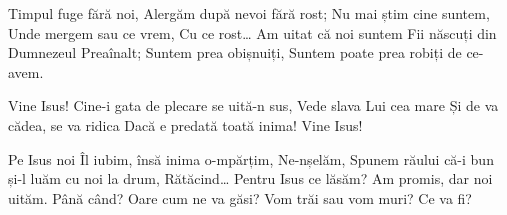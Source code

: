 \beginverse
Timpul fuge fără noi,
Alergăm după nevoi fără rost;
Nu mai știm cine suntem,
Unde mergem sau ce vrem,
Cu ce rost…
Am uitat că noi suntem
Fii născuți din Dumnezeul Preaînalt;
Suntem prea obișnuiți,
Suntem poate prea robiți de ce-avem.
\endverse

\beginchorus
Vine Isus!
Cine-i gata de plecare se uită-n sus,
Vede slava Lui cea mare
Și de va cădea, se va ridica
Dacă e predată toată inima!
Vine Isus!
\endchorus

\beginverse
Pe Isus noi Îl iubim, însă inima o-mpărțim,
Ne-nșelăm,
Spunem răului că-i bun și-l luăm cu noi la drum,
Rătăcind…
Pentru Isus ce lăsăm?
Am promis, dar noi uităm. Până când?
Oare cum ne va găsi?
Vom trăi sau vom muri? Ce va fi?
\endverse
\endsong